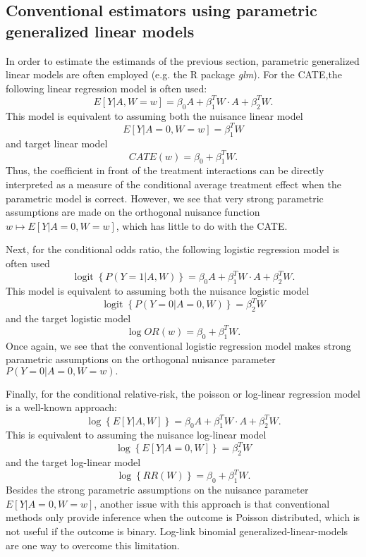 \documentclass{article}
\DeclareMathOperator{\logit}{logit}
\begin{document}
\subsection{Conventional estimators using parametric generalized linear models}
In order to estimate the estimands of the previous section, parametric generalized linear models are often employed (e.g. the R package \textit{glm}). For the CATE,the following linear regression model is often used:
$$E[Y|A, W=w] = \beta_0 A +  \beta_1^T W \cdot A + \beta_2^T W.$$
This model is equivalent to assuming both the nuisance linear model
$$E[Y|A=0,W=w] =  \beta_1^T W$$
and target linear model
$$CATE(w) = \beta_0 + \beta_1^T W.$$
Thus, the coefficient in front of the treatment interactions can be directly interpreted as a measure of the conditional average treatment effect when the parametric model is correct. However, we see that very strong parametric assumptions are made on the orthogonal nuisance function $w \mapsto E[Y|A=0,W=w]$, which has little to do with the CATE.

Next, for the conditional odds ratio, the following logistic regression model is often used
$$\logit \left\{P(Y=1|A,W) \right\} =  \beta_0 A +  \beta_1^T W \cdot A + \beta_2^T W.$$
This model is equivalent to assuming both the nuisance logistic model
$$\logit\left\{P(Y=0|A=0,W) \right\} =   \beta_2^T W$$
and the target logistic model
$$\log OR(w) =  \beta_0  +  \beta_1^T W. $$
Once again, we see that the conventional logistic regression model makes strong parametric assumptions on the orthogonal nuisance parameter $P(Y=0|A=0,W=w).$

Finally, for the conditional relative-risk, the poisson or log-linear regression model is a well-known approach:
$$\log \left\{E[Y|A,W] \right\} =  \beta_0 A +  \beta_1^T W \cdot A + \beta_2^T W.$$
This is equivalent to assuming the nuisance log-linear model
$$\log \left\{E[Y|A=0,W] \right\} = \beta_2^T W$$
and the target log-linear model
$$\log \left\{RR(W) \right\} =  \beta_0  +  \beta_1^T W. $$
Besides the strong parametric assumptions on the nuisance parameter $E[Y|A=0,W=w]$, another issue with this approach is that conventional methods only provide inference when the outcome is Poisson distributed, which is not useful if the outcome is binary. Log-link binomial generalized-linear-models are one way to overcome this limitation. 
\end{document}
